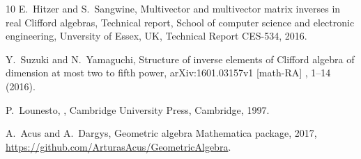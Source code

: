 \documentclass{birkjour}
\begin{document}
\begin{thebibliography}{10}
E.~Hitzer and S.~Sangwine,
\newblock Multivector and multivector matrix inverses in real Clifford
  algebras,
\newblock Technical report, School of computer science and electronic
  engineering, Unversity of Essex, UK, Technical Report CES-534, 2016.

Y.~Suzuki and N.~Yamaguchi,
\newblock Structure of inverse elements of Clifford algebra of dimension at
  most two to fifth power,
\newblock arXiv:1601.03157v1 [math-RA] , 1--14 (2016).

P.~Lounesto,
,
\newblock Cambridge University Press, Cambridge, 1997.

A.~Acus and A.~Dargys,
\newblock Geometric algebra Mathematica package, 2017,
 \url{https://github.com/ArturasAcus/GeometricAlgebra}.



\end{thebibliography}
\end{document}

